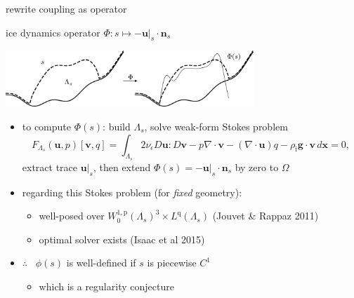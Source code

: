 \documentclass[usepdftitle=false,usenames,dvipsnames]{beamer}
\newcommand{\eps}{\epsilon}
\newcommand{\Div}{\nabla\cdot}
\newcommand{\bg}{\mathbf{g}}
\newcommand{\bn}{\mathbf{n}}
\newcommand{\bu}{\mathbf{u}}
\newcommand{\bv}{\mathbf{v}}
\newcommand{\bx}{\mathbf{x}}
\newcommand{\rhoi}{\rho_{\text{i}}}
\newcommand{\pp}{{\text{p}}}
\newcommand{\qq}{{\text{q}}}
\newcommand{\bus}{\bu|_s}
\begin{document}
\begin{frame}{rewrite coupling as operator}

\begin{block}{ice dynamics operator}
$\Phi : s \mapsto - \bus \cdot \bn_s$

\vspace{-3mm}

\hfill \includegraphics[width=0.7\textwidth]{figs/idoaction.png}
\end{block}

\begin{itemize}
\item to compute $\Phi(s)$: build $\Lambda_s$, solve weak-form Stokes problem
    $$F_{\Lambda_s}(\bu,p)[\bv,q] = \int_{\Lambda_s} 2 \nu_\eps D\bu : D\bv - p \Div\bv - (\Div\bu) q - \rhoi \bg \cdot \bv\,d\bx = 0,$$
extract trace $\bus$, then extend $\Phi(s) = -\bus \cdot \bn_s$ by zero to $\Omega$
\item regarding this Stokes problem (for \emph{fixed} geometry):
    \begin{itemize}
    \item well-posed over $W_0^{1,\pp}(\Lambda_s)^3 \times L^\qq(\Lambda_s)$ (Jouvet \& Rappaz 2011)
    \item optimal solver exists (Isaac et al 2015)
    \end{itemize}
\item $\therefore$ \, $\phi(s)$ is well-defined if $s$ is piecewise $C^1$
    \begin{itemize}
    \item which is a regularity conjecture
    \end{itemize}
\end{itemize}

\end{frame}
\end{document}
